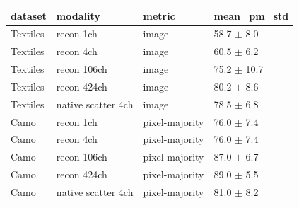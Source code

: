 \begin{tabular}{llll}
\toprule
dataset & modality & metric & mean_pm_std \\
\midrule
Textiles & recon 1ch & image & 58.7 $\pm$ 8.0 \\
Textiles & recon 4ch & image & 60.5 $\pm$ 6.2 \\
Textiles & recon 106ch & image & 75.2 $\pm$ 10.7 \\
Textiles & recon 424ch & image & 80.2 $\pm$ 8.6 \\
Textiles & native scatter 4ch & image & 78.5 $\pm$ 6.8 \\
Camo & recon 1ch & pixel-majority & 76.0 $\pm$ 7.4 \\
Camo & recon 4ch & pixel-majority & 76.0 $\pm$ 7.4 \\
Camo & recon 106ch & pixel-majority & 87.0 $\pm$ 6.7 \\
Camo & recon 424ch & pixel-majority & 89.0 $\pm$ 5.5 \\
Camo & native scatter 4ch & pixel-majority & 81.0 $\pm$ 8.2 \\
\bottomrule
\end{tabular}
